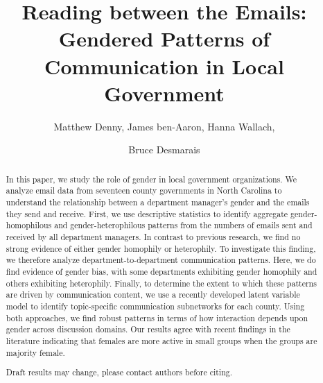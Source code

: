 \documentclass{pnastwo}
\begin{document}
\title{Reading between the Emails: Gendered Patterns of Communication in Local Government}

\author{
Matthew Denny,
James ben-Aaron,
Hanna Wallach,
\and Bruce Desmarais
}

\contributor{\vspace{-.25cm}}


\maketitle

%
\begin{article}
\begin{abstract}
	
{In this paper, we study the role of gender in local government
organizations. We analyze email data from seventeen county
governments in North Carolina to understand the relationship
between a department manager's gender and the emails they send
and receive. First, we use descriptive statistics to identify
aggregate gender-homophilous and gender-heterophilous patterns
from the numbers of emails sent and received by all department
managers. In contrast to previous research, we find no strong
evidence of either gender homophily or heterophily. To
investigate this finding, we therefore analyze
department-to-department communication patterns. Here, we do find
evidence of gender bias, with some departments exhibiting gender
homophily and others exhibiting heterophily. Finally, to
determine the extent to which these patterns are driven by
communication content, we use a recently developed latent
variable model to identify topic-specific communication
subnetworks for each county. Using both approaches, we find 
robust patterns in terms of how interaction depends upon gender 
across discussion domains. Our results agree with recent findings 
in the literature indicating that females are more active in 
small groups when the groups are majority female.

\begin{center}
Draft results may change, please contact authors before citing.
\end{center}
}
\end{abstract} 


\end{article}
\end{document}
